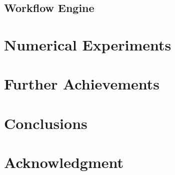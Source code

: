 \documentclass[10pt,conference]{IEEEtran}
\begin{document}
\subsection{Workflow Engine}

\section{Numerical Experiments}
\label{sec:experiment}

\section{Further Achievements}
\label{sec:futureworks}

\section{Conclusions}
\label{sec:conclusion}

\section*{Acknowledgment}


%

\end{document}
